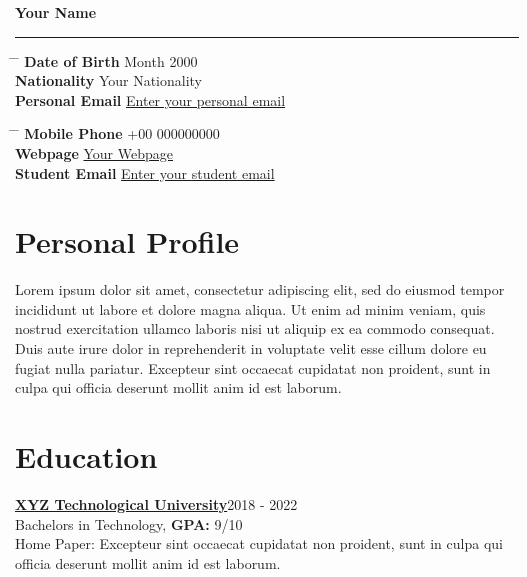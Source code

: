 \documentclass[10pt]{article}
\begin{document}
{\centering
\color{battleshipgrey}
{\bf\huge Your Name}\\
\rule{19cm}{0.5pt}}

\indent\indent
\parbox{\textwidth}{ 
	\begin{tabbing}
		\hspace{3cm} \= \hspace{4cm} \= \kill 
		{\bf Date of Birth}  Month 2000 \\
		{\bf Nationality} \> Your Nationality \\
		{\bf Personal Email} \> \href{mailto:example@xyz.com}{Enter your personal email} 
	\end{tabbing}
}
\indent\indent\indent\indent 
\parbox{\textwidth}{ 
	\begin{tabbing} 
		\hspace{3cm} \= \hspace{4cm} \= \kill 
		{\bf Mobile Phone} \> +00 000000000 \\
		{\bf Webpage} \> \href{webpage.io}{Your Webpage} \\ 
		{\bf Student Email} \> \href{mailto:example@xyz.com}{Enter your student email} 
	\end{tabbing}
}


\section{{\color{battleshipgrey}Personal Profile}}
	Lorem ipsum dolor sit amet, consectetur adipiscing elit, sed do eiusmod tempor incididunt ut labore et dolore magna aliqua. Ut enim ad minim veniam, quis nostrud exercitation ullamco laboris nisi ut aliquip ex ea commodo consequat. Duis aute irure dolor in reprehenderit in voluptate velit esse cillum dolore eu fugiat nulla pariatur. Excepteur sint occaecat cupidatat non proident, sunt in culpa qui officia deserunt mollit anim id est laborum.


\section{{\color{battleshipgrey}Education}}
	\href{http://yourinstitute.edu}{\bf XYZ Technological University}\hfill 2018 - 2022 \\
	Bachelors in Technology, {\bf GPA:} 9/10 \\
	Home Paper: Excepteur sint occaecat cupidatat non proident, sunt in culpa qui officia deserunt mollit anim id est laborum.
\end{document}
